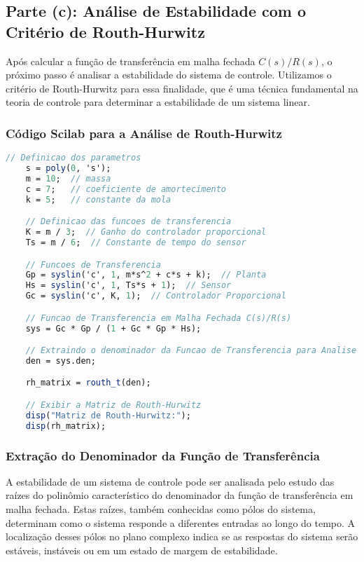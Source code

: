 
\subsection{Parte (c): Análise de Estabilidade com o Critério de Routh-Hurwitz}

Após calcular a função de transferência em malha fechada \(C(s)/R(s)\), o próximo passo é analisar a estabilidade do sistema de controle. Utilizamos o critério de Routh-Hurwitz para essa finalidade, que é uma técnica fundamental na teoria de controle para determinar a estabilidade de um sistema linear.


\subsubsection{Código Scilab para a Análise de Routh-Hurwitz}
\begin{lstlisting}[language=Scilab, caption=Código Scilab para calcular a matriz de Routh-Hurwitz]
    // Definicao dos parametros
    s = poly(0, 's');
    m = 10;  // massa
    c = 7;   // coeficiente de amortecimento
    k = 5;   // constante da mola

    // Definicao das funcoes de transferencia
    K = m / 3;  // Ganho do controlador proporcional
    Ts = m / 6;  // Constante de tempo do sensor

    // Funcoes de Transferencia
    Gp = syslin('c', 1, m*s^2 + c*s + k);  // Planta
    Hs = syslin('c', 1, Ts*s + 1);  // Sensor
    Gc = syslin('c', K, 1);  // Controlador Proporcional

    // Funcao de Transferencia em Malha Fechada C(s)/R(s)
    sys = Gc * Gp / (1 + Gc * Gp * Hs);

    // Extraindo o denominador da Funcao de Transferencia para Analise de Estabilidade
    den = sys.den;

    rh_matrix = routh_t(den);

    // Exibir a Matriz de Routh-Hurwitz
    disp("Matriz de Routh-Hurwitz:");
    disp(rh_matrix);
\end{lstlisting}


\subsubsection{Extração do Denominador da Função de Transferência}

A estabilidade de um sistema de controle pode ser analisada pelo estudo das raízes do polinômio característico do denominador da função de transferência em malha fechada. Estas raízes, também conhecidas como pólos do sistema, determinam como o sistema responde a diferentes entradas ao longo do tempo. A localização desses pólos no plano complexo indica se as respostas do sistema serão estáveis, instáveis ou em um estado de margem de estabilidade.

